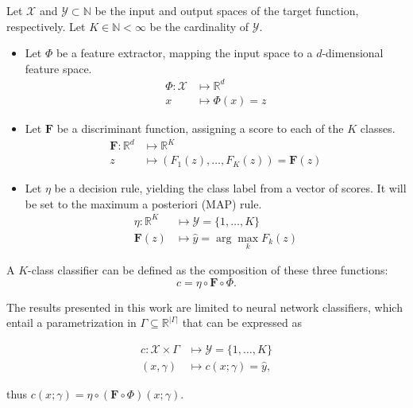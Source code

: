 \begin{definition}\label{def:classifier}
    Let $\mathcal{X}$ and $\mathcal{Y} \subset\mathbb{N}$ be the input and output spaces of the target function, respectively.
    Let $K \in \mathbb{N} < \infty$ be the cardinality of $\mathcal{Y}$.

    \begin{itemize}
        \item Let $\Phi$ be a feature extractor, mapping the input space to a $d$-dimensional feature space.
            $$ 
            \begin{aligned}
                \Phi: \mathcal{X} & \longmapsto \mathbb{R}^d \\
                x & \longmapsto \Phi(x) = z
            \end{aligned}
            $$

        \item Let $\bm{F}$ be a discriminant function, assigning a score
        to each of the $K$ classes. 
            $$
            \begin{aligned}
                \bm{F}: \mathbb{R}^d  & \longmapsto \mathbb{R}^K \\
                z & \longmapsto \left ( F_1(z), \dots, F_K(z) \right ) = \bm{F}(z)
            \end{aligned}
            $$
        \item Let $\eta$ be a decision rule, yielding the class label from a vector of scores.
        It will be set to the maximum a posteriori (MAP) rule.
            $$
                \begin{aligned}
                    \eta: \mathbb{R}^K & \longmapsto \mathcal{Y} = \{1, \dots, K \} \\
                    \bm{F}(z) & \longmapsto \hat{y} = \arg \max_{k} F_k(z)
                \end{aligned}
            $$
    \end{itemize}

    A $K$-class classifier can be defined as the composition of these three functions:
    $$
    c = \eta \circ \bm{F} \circ \Phi.
    $$

    The results presented in this work are limited to neural network classifiers, which
    entail a parametrization in $\Gamma \subseteq \mathbb{R}^{|\Gamma|}$ that can be expressed
    as

    $$
        \begin{aligned}
        c: \mathcal{X} \times \Gamma & \longmapsto \mathcal{Y} = \{1, \dots, K \} \\
        (x, \gamma) & \longmapsto c(x; \gamma) = \hat{y},
        \end{aligned}
    $$

    thus $c(x; \gamma) = \eta \circ (\bm{F} \circ \Phi)(x; \gamma)$. \\
\end{definition}

